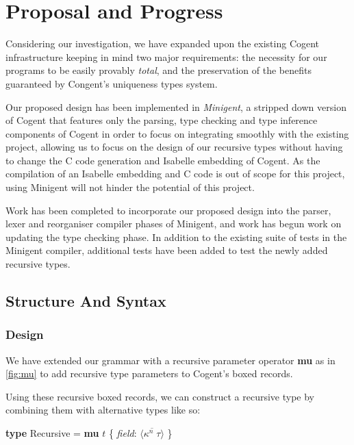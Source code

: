 \chapter{Proposal and Progress}\label{ch:style}

Considering our investigation, we have expanded upon the existing Cogent infrastructure keeping in mind
two major requirements: the necessity for our programs to be easily provably \textit{total},
and the preservation of the benefits guaranteed by Congent's uniqueness types system.

Our proposed design has been implemented in \textit{Minigent}, a stripped down version of Cogent that
features only the parsing, type checking and type inference components of Cogent in order to
focus on integrating smoothly with the existing project, allowing us to focus on the design
of our recursive types without having to change the C code generation and Isabelle embedding of Cogent.
As the compilation of an Isabelle embedding and C code is out of scope for this project,
using Minigent will not hinder the potential of this project.

Work has been completed to incorporate our proposed design into the parser, lexer and reorganiser compiler phases of
Minigent, and work has begun work on updating the type checking phase.
In addition to the existing suite of tests in the Minigent compiler, additional tests have 
been added to test the newly added recursive types.

\section{Structure And Syntax}

\subsection{Design}

We have extended our grammar with a recursive parameter operator \textbf{mu} as in \autoref{fig:mu} to add 
recursive type parameters to Cogent's boxed records.

Using these recursive boxed records, we can construct a recursive type by combining them with alternative types like so:

\begin{center}
    \textbf{type} Recursive = \textbf{mu} $t$ \{ \textit{field}: $\langle \overline{\kappa^n\; \tau} \rangle$ \}
\end{center}

